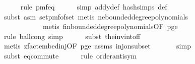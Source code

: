 \begin{isabellebody}
\ \ \ \ \isamarkupfalse%
\ {\isacharparenleft}{\kern0pt}rule\ pmf{\isacharunderscore}{\kern0pt}eq{\isacharparenright}{\kern0pt}\isanewline
\ \ \ \ \isamarkupfalse%
\ {\isacharparenleft}{\kern0pt}simp\ add{\isacharcolon}{\kern0pt}y{\isacharprime}{\kern0pt}{\isacharunderscore}{\kern0pt}def\ hash{\isachardot}{\kern0pt}simps\ {\isasymOmega}{\isacharunderscore}{\kern0pt}def{\isacharparenright}{\kern0pt}\isanewline
\ \ \ \ \isamarkupfalse%
\ {\isacharparenleft}{\kern0pt}subst\ {\isacharparenleft}{\kern0pt}asm{\isacharparenright}{\kern0pt}\ set{\isacharunderscore}{\kern0pt}pmf{\isacharunderscore}{\kern0pt}of{\isacharunderscore}{\kern0pt}set{\isacharcomma}{\kern0pt}\ metis\ ne{\isacharunderscore}{\kern0pt}bounded{\isacharunderscore}{\kern0pt}degree{\isacharunderscore}{\kern0pt}polynomials{\isacharcomma}{\kern0pt}\ \isanewline
\ \ \ \ \ \ \ \ \ \ \ \ metis\ fin{\isacharunderscore}{\kern0pt}bounded{\isacharunderscore}{\kern0pt}degree{\isacharunderscore}{\kern0pt}polynomials{\isacharbrackleft}{\kern0pt}OF\ p{\isacharunderscore}{\kern0pt}ge{\isacharunderscore}{\kern0pt}{}{\isacharbrackright}{\kern0pt}{\isacharparenright}{\kern0pt}\isanewline
\ \ \ \ \isamarkupfalse%
\ {\isacharparenleft}{\kern0pt}rule\ ball{\isacharunderscore}{\kern0pt}cong{\isacharcomma}{\kern0pt}\ simp{\isacharparenright}{\kern0pt}\isanewline
\ \ \ \ \isamarkupfalse%
\ {\isacharparenleft}{\kern0pt}subst\ the{\isacharunderscore}{\kern0pt}inv{\isacharunderscore}{\kern0pt}into{\isacharunderscore}{\kern0pt}f{\isacharunderscore}{\kern0pt}f{\isacharparenright}{\kern0pt}\isanewline
\ \ \ \ \ \ \isamarkupfalse%
\ {\isacharparenleft}{\kern0pt}metis\ zfact{\isacharunderscore}{\kern0pt}embed{\isacharunderscore}{\kern0pt}inj{\isacharbrackleft}{\kern0pt}OF\ p{\isacharunderscore}{\kern0pt}ge{\isacharunderscore}{\kern0pt}{}{\isacharbrackright}{\kern0pt}\ assms{\isacharparenleft}{\kern0pt}{}{\isacharparenright}{\kern0pt}\ inj{\isacharunderscore}{\kern0pt}on{\isacharunderscore}{\kern0pt}subset{\isacharparenright}{\kern0pt}\isanewline
\ \ \ \ \ \isamarkupfalse%
\ {\isacharparenleft}{\kern0pt}simp{\isacharparenright}{\kern0pt}\isanewline
\ \ \ \ \isamarkupfalse%
\ {\isacharparenleft}{\kern0pt}subst\ eq{\isacharunderscore}{\kern0pt}commute{\isacharparenright}{\kern0pt}\isanewline
\ \ \ \ \isamarkupfalse%
\ {\isacharparenleft}{\kern0pt}rule\ order{\isacharunderscore}{\kern0pt}antisym{\isacharparenright}{\kern0pt}\isanewline

\end{isabellebody}
